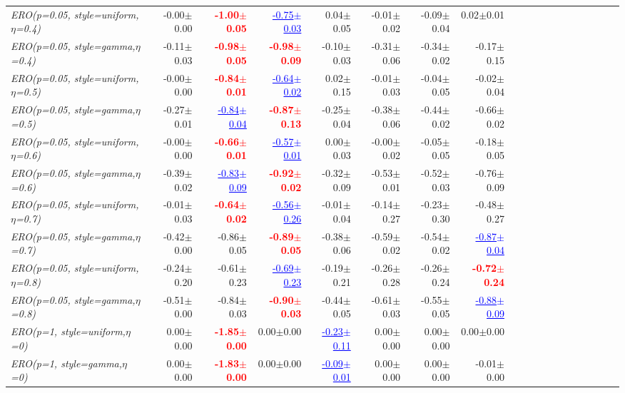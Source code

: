 \documentclass[nohyperref]{article}
\theoremstyle{plain}
\theoremstyle{definition}
\theoremstyle{remark}
\newcommand{\red}[1]{\textcolor{red}{\textbf{#1}}}
\newcommand{\blue}[1]{\textcolor{blue}{\underline{#1}}}
\begin{document}
\begin{table*}[!ht]
{\begin{tabular}{lrrrrrrrrrrrrrrrrrr}
			{\it ERO(p=0.05, style=uniform,$\eta$=0.4)} & -0.00$\pm$0.00 & \red{-1.00$\pm$0.05} & \blue{-0.75$\pm$0.03} & 0.04$\pm$0.05 & -0.01$\pm$0.02 & -0.09$\pm$0.04 & 0.02$\pm$0.01 \\
			{\it ERO(p=0.05, style=gamma,$\eta$=0.4)} & -0.11$\pm$0.03 & \red{-0.98$\pm$0.05} & \red{-0.98$\pm$0.09} & -0.10$\pm$0.03 & -0.31$\pm$0.06 & -0.34$\pm$0.02 & -0.17$\pm$0.15 \\
			{\it ERO(p=0.05, style=uniform,$\eta$=0.5)} & -0.00$\pm$0.00 & \red{-0.84$\pm$0.01} & \blue{-0.64$\pm$0.02} & 0.02$\pm$0.15 & -0.01$\pm$0.03 & -0.04$\pm$0.05 & -0.02$\pm$0.04 \\
			{\it ERO(p=0.05, style=gamma,$\eta$=0.5)} & -0.27$\pm$0.01 & \blue{-0.84$\pm$0.04} & \red{-0.87$\pm$0.13} & -0.25$\pm$0.04 & -0.38$\pm$0.06 & -0.44$\pm$0.02 & -0.66$\pm$0.02 \\
			{\it ERO(p=0.05, style=uniform,$\eta$=0.6)} & -0.00$\pm$0.00 & \red{-0.66$\pm$0.01} & \blue{-0.57$\pm$0.01} & 0.00$\pm$0.03 & -0.00$\pm$0.02 & -0.05$\pm$0.05 & -0.18$\pm$0.05 \\
			{\it ERO(p=0.05, style=gamma,$\eta$=0.6)} & -0.39$\pm$0.02 & \blue{-0.83$\pm$0.09} & \red{-0.92$\pm$0.02} & -0.32$\pm$0.09 & -0.53$\pm$0.01 & -0.52$\pm$0.03 & -0.76$\pm$0.09 \\
			{\it ERO(p=0.05, style=uniform,$\eta$=0.7)} & -0.01$\pm$0.03 & \red{-0.64$\pm$0.02} & \blue{-0.56$\pm$0.26} & -0.01$\pm$0.04 & -0.14$\pm$0.27 & -0.23$\pm$0.30 & -0.48$\pm$0.27 \\
			{\it ERO(p=0.05, style=gamma,$\eta$=0.7)} & -0.42$\pm$0.00 & -0.86$\pm$0.05 & \red{-0.89$\pm$0.05} & -0.38$\pm$0.06 & -0.59$\pm$0.02 & -0.54$\pm$0.02 & \blue{-0.87$\pm$0.04} \\
			{\it ERO(p=0.05, style=uniform,$\eta$=0.8)} & -0.24$\pm$0.20 & -0.61$\pm$0.23 & \blue{-0.69$\pm$0.23} & -0.19$\pm$0.21 & -0.26$\pm$0.28 & -0.26$\pm$0.24 & \red{-0.72$\pm$0.24} \\
			{\it ERO(p=0.05, style=gamma,$\eta$=0.8)} & -0.51$\pm$0.00 & -0.84$\pm$0.03 & \red{-0.90$\pm$0.03} & -0.44$\pm$0.05 & -0.61$\pm$0.03 & -0.55$\pm$0.05 & \blue{-0.88$\pm$0.09} \\
			{\it ERO(p=1, style=uniform,$\eta$=0)} & 0.00$\pm$0.00 & \red{-1.85$\pm$0.00} & 0.00$\pm$0.00 & \blue{-0.23$\pm$0.11} & 0.00$\pm$0.00 & 0.00$\pm$0.00 & 0.00$\pm$0.00 \\
			{\it ERO(p=1, style=gamma,$\eta$=0)} & 0.00$\pm$0.00 & \red{-1.83$\pm$0.00} & 0.00$\pm$0.00 & \blue{-0.09$\pm$0.01} & 0.00$\pm$0.00 & 0.00$\pm$0.00 & -0.01$\pm$0.00 \\

\end{tabular}}
\end{table*}
\end{document}
